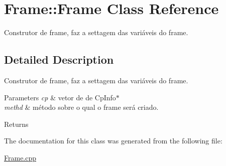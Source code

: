 \hypertarget{class_frame_1_1_frame}{}\section{Frame\+:\+:Frame Class Reference}
\label{class_frame_1_1_frame}


Construtor de frame, faz a settagem das variáveis do frame.  




\subsection{Detailed Description}
Construtor de frame, faz a settagem das variáveis do frame. 


\begin{DoxyParams}{Parameters}
{\em cp} & vetor de de Cp\+Info$\ast$ \\
\hline
{\em methd} & método sobre o qual o frame será criado. \\
\hline
\end{DoxyParams}
\begin{DoxyReturn}{Returns}

\end{DoxyReturn}


The documentation for this class was generated from the following file\+:\begin{DoxyCompactItemize}
\item 
\hyperlink{_frame_8cpp}{Frame.\+cpp}\end{DoxyCompactItemize}
